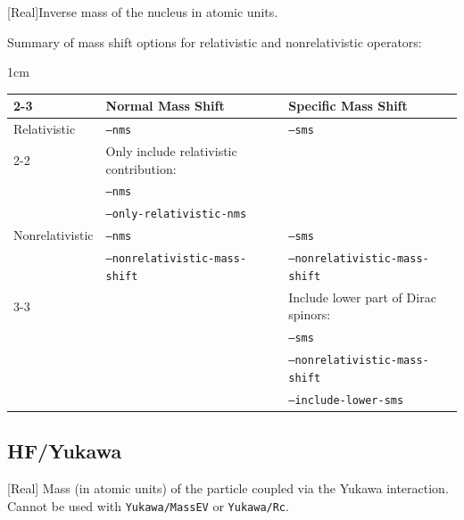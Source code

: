 \documentclass{report}
\begin{document}
[Real]{Inverse mass of the nucleus in atomic units.}






Summary of mass shift options for relativistic and nonrelativistic operators:
\begin{adjustwidth}{1cm}{}
	\begin{tabular}{|l|l|l|}
		\cline{2-3}
		\multicolumn{1}{c|}{} & Normal Mass Shift & Specific Mass Shift \\
		\hline
		Relativistic & \texttt{--nms} & \texttt{--sms} \\
		\cline{2-2}
		& Only include relativistic contribution: & \\
		& \texttt{--nms} & \\
		& \texttt{--only-relativistic-nms} & \\
		\hline
		Nonrelativistic & \texttt{--nms} & \texttt{--sms} \\
		& \texttt{--nonrelativistic-mass-shift} & \texttt{--nonrelativistic-mass-shift} \\
		\cline{3-3}
		& & Include lower part of Dirac spinors: \\
		& & \texttt{--sms} \\
		& & \texttt{--nonrelativistic-mass-shift} \\
		& & \texttt{--include-lower-sms} \\
		\hline
	\end{tabular}
\end{adjustwidth}

\subsection{HF/Yukawa}

[Real]{%
Mass (in atomic units) of the particle coupled via the Yukawa interaction. Cannot be used with \texttt{Yukawa/MassEV} or \texttt{Yukawa/Rc}.%
}
\end{document}
